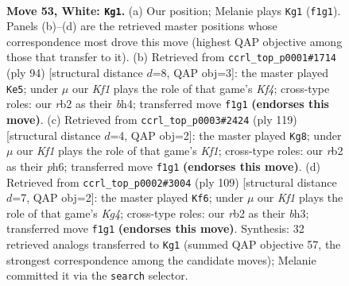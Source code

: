 \documentclass[11pt]{article}
\begin{document}
\clearpage

\begin{figure}[p]\centering
\begin{subfigure}{0.46\textwidth}\centering
\resizebox{\linewidth}{!}{%
\newchessgame
\chessboard[
  setfen={8/2k5/8/4p1p1/5p2/5B2/1r6/5K2 w - - 17 53},
  showmover=false,
  pgfstyle=straightmove, color=movearrow, markmove={f1-g1}
]}
\caption{}
\end{subfigure}\hfill
\begin{subfigure}{0.46\textwidth}\centering
\resizebox{\linewidth}{!}{%
\newchessgame
\chessboard[
  setfen={6k1/8/8/1p6/2p2K1b/2B5/8/8 w - - 0 48},
  showmover=false,
  pgfstyle=straightmove, color=movearrow, markmove={f4-e5}
]}
\caption{}
\end{subfigure}
\\[4pt]
\begin{subfigure}{0.46\textwidth}\centering
\resizebox{\linewidth}{!}{%
\newchessgame
\chessboard[
  setfen={5k2/8/4K2P/6P1/5P2/8/1b6/8 b - - 0 60},
  showmover=false,
  pgfstyle=straightmove, color=movearrow, markmove={f8-g8}
]}
\caption{}
\end{subfigure}\hfill
\begin{subfigure}{0.46\textwidth}\centering
\resizebox{\linewidth}{!}{%
\newchessgame
\chessboard[
  setfen={8/8/1b1p4/1P1P2k1/2P5/5K1B/8/8 b - - 0 55},
  showmover=false,
  pgfstyle=straightmove, color=movearrow, markmove={g5-f6}
]}
\caption{}
\end{subfigure}
\caption{\textbf{Move 53, White: \texttt{Kg1}.} (a) Our position; Melanie plays \texttt{Kg1} (\texttt{f1g1}). Panels (b)--(d) are the retrieved master positions whose correspondence most drove this move (highest QAP objective among those that transfer to it). (b) Retrieved from \texttt{ccrl\_top\_p0001\#1714} (ply 94) [structural distance $d$=8, QAP obj=3]: the master played \texttt{Ke5}; under $\mu$ our \emph{Kf1} plays the role of that game's \emph{Kf4}; cross-type roles: our \emph{r}b2 as their \emph{b}h4; transferred move \texttt{f1g1} \textbf{(endorses this move)}. (c) Retrieved from \texttt{ccrl\_top\_p0003\#2424} (ply 119) [structural distance $d$=4, QAP obj=2]: the master played \texttt{Kg8}; under $\mu$ our \emph{Kf1} plays the role of that game's \emph{Kf1}; cross-type roles: our \emph{r}b2 as their \emph{p}h6; transferred move \texttt{f1g1} \textbf{(endorses this move)}. (d) Retrieved from \texttt{ccrl\_top\_p0002\#3004} (ply 109) [structural distance $d$=7, QAP obj=2]: the master played \texttt{Kf6}; under $\mu$ our \emph{Kf1} plays the role of that game's \emph{Kg4}; cross-type roles: our \emph{r}b2 as their \emph{b}h3; transferred move \texttt{f1g1} \textbf{(endorses this move)}. Synthesis: 32 retrieved analogs transferred to \texttt{Kg1} (summed QAP objective 57, the strongest correspondence among the candidate moves); Melanie committed it via the \texttt{search} selector.}
\label{fig:thought-m104}
\end{figure}
\end{document}
